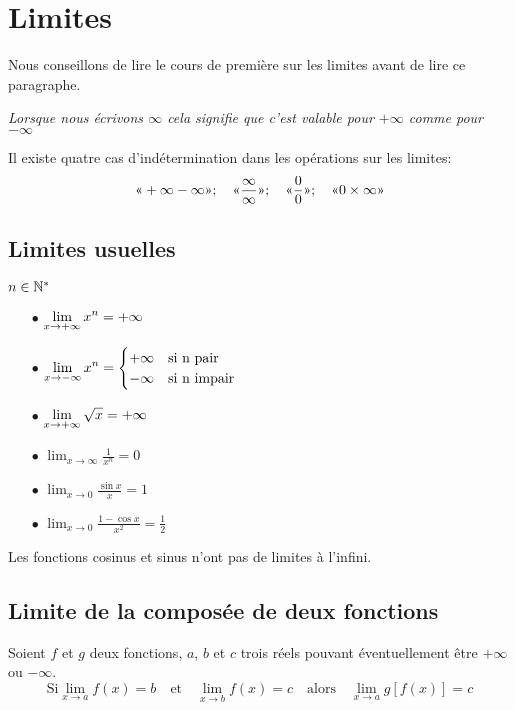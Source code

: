 




\section{Limites}
Nous conseillons de lire le cours de première sur les limites avant de lire ce paragraphe.

\textsl{Lorsque nous écrivons $ \infty $ cela signifie que c'est valable pour $ +\infty$ comme pour $-\infty $ }

 Il existe quatre cas d'indétermination dans les opérations sur les limites:
\[ \text{<<} +\infty -\infty \text{>>};\quad\text{<<} \frac{\infty}{\infty} \text{>>};\quad\text{<<} \frac{0}{0}\text{>>};\quad \text{<<} 0\times \infty \text{>>} \]
\subsection{Limites usuelles}
 $ n\in\mathbb{N}^* $
\begin{itemize}
\item[$ \bullet $] $\displaystyle \lim_{x \to +\infty}x^{n}= +\infty$ 
\item[$ \bullet $] $\displaystyle\lim_{x \to -\infty}x^{n}= \begin{cases}
+\infty & \text{si n pair} \\
-\infty & \text{si  n impair}
\end{cases}$ 
\item[$ \bullet $] $\displaystyle \lim_{x \to +\infty}\sqrt{x}=+\infty$ 
\item[$ \bullet $] $\displaystyle \lim_{x \to \infty} \frac{1}{x^{n}}=0$ 
\item[$ \bullet $] $\displaystyle \lim_{x \to 0}\frac{\sin x}{x}=1$ 
\item[$ \bullet $] $ \displaystyle\lim_{x \to 0}\frac{1-\cos x}{x^{2}}= \frac{1}{2}$ 

\end{itemize}
\begin{remark}
Les fonctions cosinus et sinus n'ont pas de limites à l'infini.
\end{remark}
\subsection{Limite de la composée de deux fonctions}
 Soient $f $  et $g$ deux fonctions, $a $, $b$  et  $c$ trois réels pouvant éventuellement être $ +\infty $ ou $ -\infty $. 
\[\text{Si}\displaystyle \lim_{x \to a} f(x) = b \quad \text{et} \quad \displaystyle \lim_{x \to b} f(x) = c \quad \text{alors} \quad \displaystyle \lim_{x \to a} g[f(x)] = c \]
  
